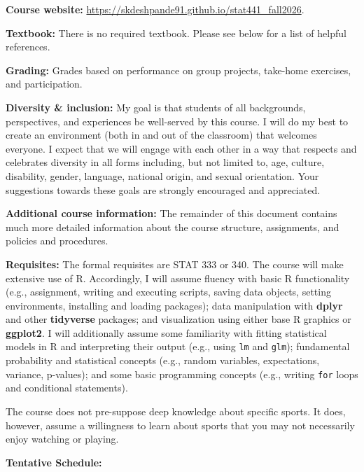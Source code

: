 \documentclass[11pt]{article}
\begin{document}
\textbf{Course website:} \url{https://skdeshpande91.github.io/stat441_fall2026}. %

\textbf{Textbook:} There is no required textbook. Please see below for a list of helpful references.

\textbf{Grading:} Grades based on performance on group projects, take-home exercises, and participation.

\textbf{Diversity \& inclusion:} My goal is that students of all backgrounds, perspectives, and experiences be well-served by this course. I will do my best to create an environment (both in and out of the classroom) that welcomes everyone. 
I expect that we will engage with each other in a way that respects and celebrates diversity in all forms including, but not limited to, age, culture, disability, gender, language, national origin, and sexual orientation. 
Your suggestions towards these goals are strongly encouraged and appreciated.

\textbf{Additional course information:} The remainder of this document contains much more detailed information about the course structure, assignments, and policies and procedures.

\newpage

\textbf{Requisites:} The formal requisites are STAT 333 or 340. 
The course will make extensive use of \textsf{R}. 
Accordingly, I will assume fluency with basic \textsf{R} functionality (e.g., assignment, writing and executing scripts, saving data objects, setting environments, installing and loading packages); data manipulation with \textbf{dplyr} and other \textbf{tidyverse} packages; and visualization using either base \textsf{R} graphics or \textbf{ggplot2}.
I will additionally assume some familiarity with fitting statistical models in \textsf{R} and interpreting their output (e.g., using \texttt{lm} and \texttt{glm}); fundamental probability and statistical concepts (e.g., random variables, expectations, variance, p-values); and some basic programming concepts (e.g., writing \texttt{for} loops and conditional statements).

The course does not pre-suppose deep knowledge about specific sports. 
It does, however, assume a willingness to learn about sports that you may not necessarily enjoy watching or playing.

\textbf{Tentative Schedule:}
\end{document}
